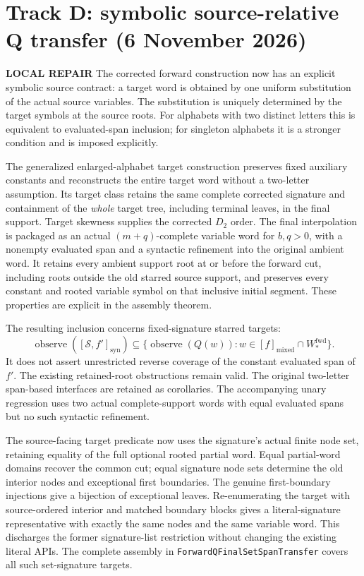 \documentclass[11pt]{article}
\newcommand{\fix}{\textcolor{blue!70!black}{\textbf{LOCAL REPAIR}}}
\begin{document}
\section{Track D: symbolic source-relative Q transfer (6 November 2026)}
\fix
The corrected forward construction now has an explicit symbolic source
contract: a target word is obtained by one uniform substitution of the
actual source variables.  The substitution is uniquely determined by the
target symbols at the source roots.  For alphabets with two distinct
letters this is equivalent to evaluated-span inclusion; for singleton
alphabets it is a stronger condition and is imposed explicitly.

The generalized enlarged-alphabet target construction preserves fixed
auxiliary constants and reconstructs the entire target word without a
two-letter assumption.  Its target class retains the same complete
corrected signature and containment of the \emph{whole} target tree,
including terminal leaves, in the final support.  Target skewness supplies
the corrected $D_2$ order.  The final interpolation is packaged as an
actual $(m+q)$-complete variable word for $b,q>0$, with a nonempty evaluated
span and a syntactic refinement into the original ambient word.
It retains every ambient support root at or before the forward cut,
including roots outside the old starred source support, and preserves
every constant and rooted variable symbol on that inclusive initial
segment.  These properties are explicit in the assembly theorem.

The resulting inclusion concerns fixed-signature starred targets:
\[
 \operatorname{observe}([\mathcal S,f']_{\mathrm{syn}})
 \subseteq
 \{\operatorname{observe}(Q(w)):w\in[f]_{\mathrm{mixed}}
          \cap W_*^{\mathrm{fwd}}\}.
\]
It does not assert unrestricted reverse coverage of the constant evaluated
span of $f'$.  The existing retained-root obstructions remain valid.
The original two-letter span-based interfaces are retained as corollaries.
The accompanying unary regression uses two actual complete-support words
with equal evaluated spans but no such syntactic refinement.

The source-facing target predicate now uses the signature's actual finite
node set, retaining equality of the full optional rooted partial word.
Equal partial-word domains recover the common cut; equal signature node
sets determine the old interior nodes and exceptional first boundaries.
The genuine first-boundary injections give a bijection of exceptional
leaves.  Re-enumerating the target with source-ordered interior and matched
boundary blocks gives a literal-signature representative with exactly
the same nodes and the same variable word.  This discharges the former
signature-list restriction without changing the existing literal APIs.
The complete assembly in \texttt{ForwardQFinalSetSpanTransfer} covers all
such set-signature targets.
\end{document}
